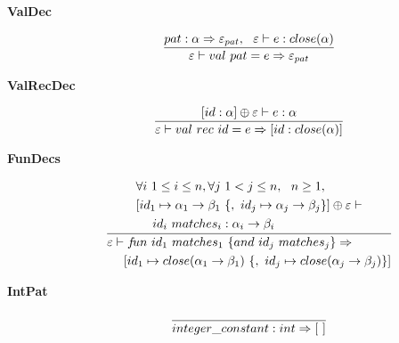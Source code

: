 \documentclass[10pt]{luthercs}
\begin{document}
{\begin{description}
\item[{\textbf{ValDec}}] \begin{gather}
\begin{split}\frac{pat:\alpha\Rightarrow\varepsilon_{pat},~~\varepsilon\vdash e:close(\alpha)}{\varepsilon\vdash val~pat=e\Rightarrow\varepsilon_{pat}}\end{split}\notag
\end{gather}
\end{description}


\begin{description}
\item[{\textbf{ValRecDec}}] \begin{gather}
\begin{split}\frac{[id:\alpha]\oplus\varepsilon\vdash e:\alpha}{\varepsilon\vdash val~rec~id=e\Rightarrow[id:close(\alpha)]}\end{split}\notag
\end{gather}
\end{description}

\begin{description}
\item[{\textbf{FunDecs}}] \begin{gather}
\frac{\begin{split} & \forall i~1 \leq i \leq n, \forall j~1 < j \leq n,~~n \geq 1, \\ 
& [id_1\mapsto\alpha_1\rightarrow\beta_1~\{,~id_j\mapsto\alpha_j\rightarrow\beta_j\}]\oplus\varepsilon\vdash \\ & ~~~~id_i~matches_i:\alpha_i\rightarrow\beta_i\end{split}}{\begin{split} & \varepsilon\vdash f\!un~id_1~matches_1~\{and~id_j~matches_j\}\Rightarrow \\ & ~~~~[id_1\mapsto close(\alpha_1\rightarrow\beta_1)~\{,~id_j\mapsto close(\alpha_j\rightarrow\beta_j)\}]\end{split}}\notag
\end{gather}
\end{description}

\begin{description}
\item[{\textbf{IntPat}}] \begin{gather}
\begin{split}\frac{}{integer\_constant:int \Rightarrow [~]}\end{split}\notag
\end{gather}
\end{description}


}
\end{document}
